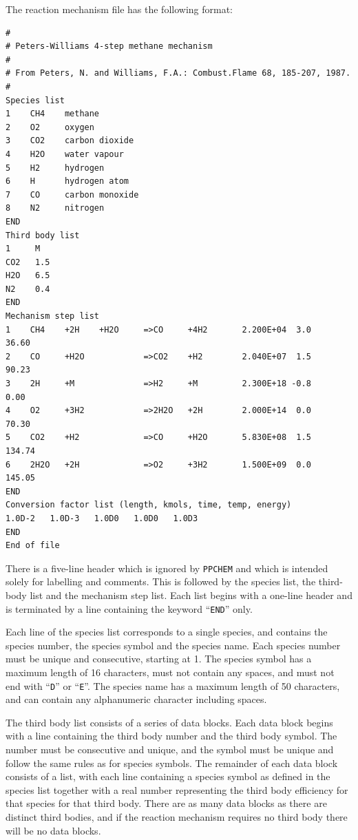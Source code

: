 \documentclass[dvips]{article}
\begin{document}
\noindent
The reaction mechanism file has the following format:
\begin{verbatim}
#
# Peters-Williams 4-step methane mechanism 
#
# From Peters, N. and Williams, F.A.: Combust.Flame 68, 185-207, 1987.
#
Species list
1    CH4    methane
2    O2     oxygen
3    CO2    carbon dioxide
4    H2O    water vapour
5    H2     hydrogen
6    H      hydrogen atom
7    CO     carbon monoxide
8    N2     nitrogen
END
Third body list
1     M
CO2   1.5
H2O   6.5
N2    0.4
END
Mechanism step list
1    CH4    +2H    +H2O     =>CO     +4H2       2.200E+04  3.0       36.60
2    CO     +H2O            =>CO2    +H2        2.040E+07  1.5       90.23
3    2H     +M              =>H2     +M         2.300E+18 -0.8        0.00
4    O2     +3H2            =>2H2O   +2H        2.000E+14  0.0       70.30
5    CO2    +H2             =>CO     +H2O       5.830E+08  1.5      134.74
6    2H2O   +2H             =>O2     +3H2       1.500E+09  0.0      145.05
END   
Conversion factor list (length, kmols, time, temp, energy)
1.0D-2   1.0D-3   1.0D0   1.0D0   1.0D3
END
End of file
\end{verbatim}
There is a five-line header which is ignored by {\tt PPCHEM} and which is
intended solely for labelling and comments.  This is followed by the species
list, the third-body list and the mechanism step list.  Each list begins
with a one-line header and is terminated by a line containing the
keyword ``{\tt END}'' only.

Each line of the species list corresponds to a single species, and contains
the species number, the species symbol and the species name.  Each species
number must be unique and consecutive, starting at 1.
The species symbol has a maximum length of 16 characters,
must not contain any spaces, and must not end with ``{\tt D}'' or ``{\tt E}''.
The species name has a maximum length of 50 characters, and can contain any
alphanumeric character including spaces.

The third body list consists of a series of data blocks.  Each data
block begins with a line containing the third body number and the third
body symbol.  The number must be consecutive and unique, and the symbol
must be unique and follow the same rules as for species symbols.  The
remainder of each data block consists of a list, with each line
containing a species symbol as defined in the species list together with
a real number representing the third body efficiency for that species
for that third body.  There are as many data blocks as there are
distinct third bodies, and if the reaction mechanism requires no third
body there will be no data blocks.
\end{document}
